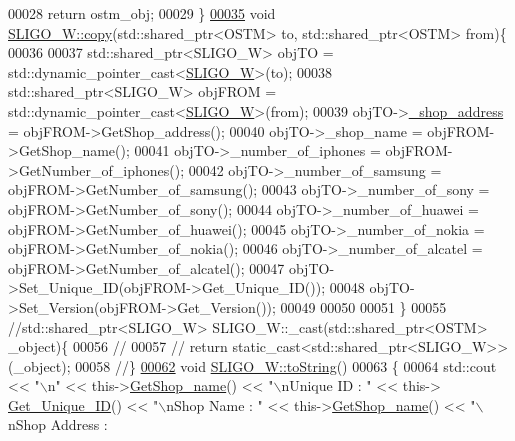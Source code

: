 \begin{DoxyCode}
00028     \textcolor{keywordflow}{return} ostm\_obj;
00029 \}
\hypertarget{_s_l_i_g_o___w_8cpp_source.tex_l00035}{}\hyperlink{class_s_l_i_g_o___w_acd5ae7347e6ca94c52eb013e07a66116_acd5ae7347e6ca94c52eb013e07a66116}{00035} \textcolor{keywordtype}{void} \hyperlink{class_s_l_i_g_o___w_acd5ae7347e6ca94c52eb013e07a66116_acd5ae7347e6ca94c52eb013e07a66116}{SLIGO\_W::copy}(std::shared\_ptr<OSTM> to, std::shared\_ptr<OSTM> from)\{
00036 
00037     std::shared\_ptr<SLIGO\_W> objTO = std::dynamic\_pointer\_cast<\hyperlink{class_s_l_i_g_o___w}{SLIGO\_W}>(to);
00038     std::shared\_ptr<SLIGO\_W> objFROM = std::dynamic\_pointer\_cast<\hyperlink{class_s_l_i_g_o___w}{SLIGO\_W}>(from);
00039     objTO->\hyperlink{class_s_l_i_g_o___w_ade08b79101c67997dde54515f2088b9d_ade08b79101c67997dde54515f2088b9d}{\_shop\_address} = objFROM->GetShop\_address();
00040     objTO->\_shop\_name = objFROM->GetShop\_name();
00041     objTO->\_number\_of\_iphones = objFROM->GetNumber\_of\_iphones();
00042     objTO->\_number\_of\_samsung = objFROM->GetNumber\_of\_samsung();
00043     objTO->\_number\_of\_sony = objFROM->GetNumber\_of\_sony();
00044     objTO->\_number\_of\_huawei = objFROM->GetNumber\_of\_huawei();
00045     objTO->\_number\_of\_nokia = objFROM->GetNumber\_of\_nokia();
00046     objTO->\_number\_of\_alcatel = objFROM->GetNumber\_of\_alcatel();
00047     objTO->Set\_Unique\_ID(objFROM->Get\_Unique\_ID());
00048     objTO->Set\_Version(objFROM->Get\_Version());
00049     
00050    
00051 \}
00055 \textcolor{comment}{//std::shared\_ptr<SLIGO\_W> SLIGO\_W::\_cast(std::shared\_ptr<OSTM> \_object)\{}
00056 \textcolor{comment}{//    }
00057 \textcolor{comment}{//    return static\_cast<std::shared\_ptr<SLIGO\_W>>(\_object);}
00058 \textcolor{comment}{//\}}
\hypertarget{_s_l_i_g_o___w_8cpp_source.tex_l00062}{}\hyperlink{class_s_l_i_g_o___w_a8f49deaa85f48ff29dd8cdeb7c9dda56_a8f49deaa85f48ff29dd8cdeb7c9dda56}{00062} \textcolor{comment}{}\textcolor{keywordtype}{void} \hyperlink{class_s_l_i_g_o___w_a8f49deaa85f48ff29dd8cdeb7c9dda56_a8f49deaa85f48ff29dd8cdeb7c9dda56}{SLIGO\_W::toString}()
00063 \{
00064     std::cout << \textcolor{stringliteral}{"\(\backslash\)n"} <<  this->\hyperlink{class_s_l_i_g_o___w_ae788518e30d9d311eb28f37da932367a_ae788518e30d9d311eb28f37da932367a}{GetShop\_name}() << \textcolor{stringliteral}{"\(\backslash\)nUnique ID : "} << this->
      \hyperlink{class_o_s_t_m_a5a01a8b98d16b1d1904ecf9356e7b71d_a5a01a8b98d16b1d1904ecf9356e7b71d}{Get\_Unique\_ID}() << \textcolor{stringliteral}{"\(\backslash\)nShop Name : "}  << this->\hyperlink{class_s_l_i_g_o___w_ae788518e30d9d311eb28f37da932367a_ae788518e30d9d311eb28f37da932367a}{GetShop\_name}() << \textcolor{stringliteral}{"\(\backslash\)nShop Address : 
}
\end{DoxyCode}
